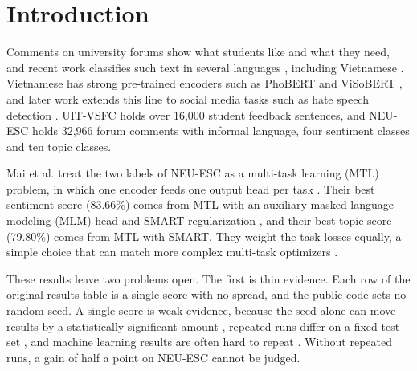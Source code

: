 \documentclass[pdflatex,sn-mathphys-num]{sn-jnl}%
\theoremstyle{thmstyleone}%
\theoremstyle{thmstyletwo}%
\theoremstyle{thmstylethree}%
\begin{document}
\maketitle

\section{Introduction}\label{sec:intro}

Comments on university forums show what students like and what they need, and recent work classifies such text in several languages \cite{malik2024student}, including Vietnamese \cite{phuc2026edupulse}. Vietnamese has strong pre-trained encoders such as PhoBERT \cite{nguyen2020phobert} and ViSoBERT \cite{nguyen2023visobert}, and later work extends this line to social media tasks such as hate speech detection \cite{nguyen2024vihatet5}. UIT-VSFC \cite{nguyen2018uitvsfc} holds over 16,000 student feedback sentences, and NEU-ESC \cite{mai2025neuesc} holds 32,966 forum comments with informal language, four sentiment classes and ten topic classes.

Mai et al. \cite{mai2025neuesc} treat the two labels of NEU-ESC as a multi-task learning (MTL) problem, in which one encoder feeds one output head per task \cite{caruana1997multitask,chen2024mtlnlp}. Their best sentiment score (83.66\%) comes from MTL with an auxiliary masked language modeling (MLM) head and SMART regularization \cite{jiang2020smart}, and their best topic score (79.80\%) comes from MTL with SMART. They weight the task losses equally, a simple choice that can match more complex multi-task optimizers \cite{royer2023scalarization}.

These results leave two problems open. The first is thin evidence. Each row of the original results table is a single score with no spread, and the public code sets no random seed. A single score is weak evidence, because the seed alone can move results by a statistically significant amount \cite{reimers2017reporting}, repeated runs differ on a fixed test set \cite{jordan2024variance}, and machine learning results are often hard to repeat \cite{semmelrock2025reproducibility}. Without repeated runs, a gain of half a point on NEU-ESC cannot be judged.
\end{document}
